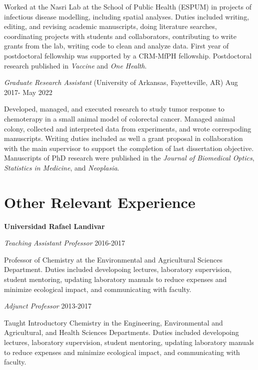 \documentclass[10pt,]{article}
\providecommand{\tightlist}{%
  \setlength{\itemsep}{0pt}\setlength{\parskip}{0pt}}
\renewenvironment{itemize}{
  \begin{list}{}{
    \setlength{\leftmargin}{1.5em}
  }
}{
  \end{list}
}
\begin{document}
Worked at the Nasri Lab at the School of Public Health (ESPUM) in
projects of infectious disease modelling, including spatial analyses.
Duties included writing, editing, and revising academic manuscripts,
doing literature searches, coordinating projects with students and
collaborators, contributing to write grants from the lab, writing code
to clean and analyze data. First year of postdoctoral fellowship was
supported by a CRM-MfPH fellowship. Postdoctoral research published in
\emph{Vaccine} and \emph{One Health}.

\emph{Graduate Research Assistant} (University of Arkansas,
Fayetteville, AR) \hfill Aug 2017- May 2022

Developed, managed, and executed research to study tumor response to
chemoterapy in a small animal model of colorectal cancer. Managed animal
colony, collected and interpreted data from experiments, and wrote
correspoding manuscripts. Writing duties included as well a grant
proposal in collaboration with the main supervisor to support the
completion of last dissertation objective. Manuscripts of PhD research
were published in the \emph{Journal of Biomedical Optics},
\emph{Statistics in Medicine}, and \emph{Neoplasia}.

\section{Other Relevant Experience}\label{other-relevant-experience}

\textbf{Universidad Rafael Landivar}

\emph{Teaching Assistant Professor} \hfill 2016-2017

\begin{itemize}
\tightlist
\item
  Professor of Chemistry at the Environmental and Agricultural Sciences
  Department. Duties included developoing lectures, laboratory
  supervision, student mentoring, updating laboratory manuals to reduce
  expenses and minimize ecological impact, and communicating with
  faculty.
\end{itemize}

\emph{Adjunct Professor} \hfill 2013-2017

\begin{itemize}
\tightlist
\item
  Taught Introductory Chemistry in the Engineering, Environmental and
  Agricultural, and Health Sciences Departments. Duties included
  developoing lectures, laboratory supervision, student mentoring,
  updating laboratory manuals to reduce expenses and minimize ecological
  impact, and communicating with faculty.
\end{itemize}
\end{document}
